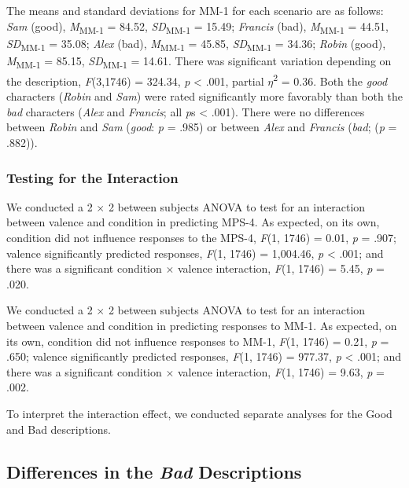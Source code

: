 \documentclass[
  english,
  man,floatsintext]{apa7}
\begin{document}
The means and standard deviations for MM-1 for each scenario are as follows:
\emph{Sam} (good),
\emph{M}\textsubscript{MM-1} = 84.52, \emph{SD}\textsubscript{MM-1} = 15.49;
\emph{Francis} (bad),
\emph{M}\textsubscript{MM-1} = 44.51, \emph{SD}\textsubscript{MM-1} = 35.08;
\emph{Alex} (bad),
\emph{M}\textsubscript{MM-1} = 45.85, \emph{SD}\textsubscript{MM-1} = 34.36;
\emph{Robin} (good),
\emph{M}\textsubscript{MM-1} = 85.15, \emph{SD}\textsubscript{MM-1} = 14.61. There was significant variation depending on the description, \emph{F}(3,1746) = 324.34, \emph{p} \textless{} .001, partial \(\eta\)\textsuperscript{2} = 0.36. Both the \emph{good} characters (\emph{Robin} and \emph{Sam}) were rated significantly more favorably than both the \emph{bad} characters (\emph{Alex} and \emph{Francis}; all \emph{p}s \textless{} .001). There were no differences between \emph{Robin} and \emph{Sam} (\emph{good}: \emph{p} = .985) or between \emph{Alex} and \emph{Francis} (\emph{bad}; (\emph{p} = .882)).

\hypertarget{testing-for-the-interaction}{%
\subsubsection{Testing for the Interaction}\label{testing-for-the-interaction}}

We conducted a 2 \(\times\) 2 between subjects ANOVA to test for an interaction between valence and condition in predicting MPS-4.
As expected, on its own, condition did not influence responses to the MPS-4,
\emph{F}(1, 1746) = 0.01, \emph{p} = .907;
valence significantly predicted responses,
\emph{F}(1, 1746) = 1,004.46, \emph{p} \textless{} .001;
and there was a significant condition \(\times\) valence interaction,
\emph{F}(1, 1746) = 5.45, \emph{p} = .020.

We conducted a 2 \(\times\) 2 between subjects ANOVA to test for an interaction between valence and condition in predicting responses to MM-1.
As expected, on its own, condition did not influence responses to MM-1,
\emph{F}(1, 1746) = 0.21, \emph{p} = .650;
valence significantly predicted responses,
\emph{F}(1, 1746) = 977.37, \emph{p} \textless{} .001;
and there was a significant condition \(\times\) valence interaction,
\emph{F}(1, 1746) = 9.63, \emph{p} = .002.

To interpret the interaction effect, we conducted separate analyses for the Good and Bad descriptions.

\hypertarget{differences-in-the-bad-descriptions-1}{%
\subsection{\texorpdfstring{Differences in the \emph{Bad} Descriptions}{Differences in the Bad Descriptions}}\label{differences-in-the-bad-descriptions-1}}
\end{document}
